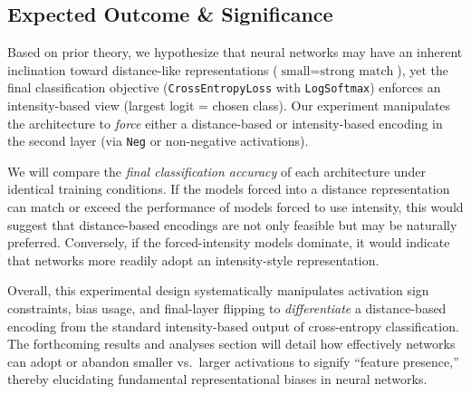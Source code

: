 \subsection{Expected Outcome \& Significance}
\label{sec:expected_outcomes}
Based on prior theory, we hypothesize that neural networks may have an inherent inclination toward distance-like representations (\( \text{small} = \text{strong match} \)), yet the final classification objective (\texttt{CrossEntropyLoss} with \texttt{LogSoftmax}) enforces an intensity-based view (largest logit = chosen class). Our experiment manipulates the architecture to \emph{force} either a distance-based or intensity-based encoding in the second layer (via \texttt{Neg} or non-negative activations). 

We will compare the \emph{final classification accuracy} of each architecture under identical training conditions. If the models forced into a distance representation can match or exceed the performance of models forced to use intensity, this would suggest that distance-based encodings are not only feasible but may be naturally preferred. Conversely, if the forced-intensity models dominate, it would indicate that networks more readily adopt an intensity-style representation. 

Overall, this experimental design systematically manipulates activation sign constraints, bias usage, and final-layer flipping to \emph{differentiate} a distance-based encoding from the standard intensity-based output of cross-entropy classification. The forthcoming results and analyses section will detail how effectively networks can adopt or abandon smaller vs.\ larger activations to signify “feature presence,” thereby elucidating fundamental representational biases in neural networks.
